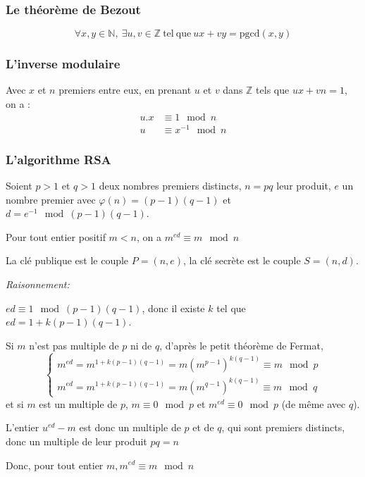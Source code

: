 \documentclass[11pt]{book}
\begin{document}
\subsubsection{Le théorème de Bezout}
$$ \forall x,y \in \mathbb{N},\ \exists u , v \in \mathbb{Z}\ \mathrm{tel\ que}\ ux+vy=\mathrm{pgcd}(x,y) $$

\subsubsection{L'inverse modulaire}
Avec $x$ et $n$ premiers entre eux, en prenant $u$ et $v$ dans $\mathbb{Z}$ tels que
$ux+vn=1$, on a : 
\begin{align*} 
  u.x &\equiv 1  \mod n  \\
  u &\equiv x^{-1} \mod n 
\end{align*}

\subsubsection{L'algorithme RSA}

Soient $p>1$ et $q>1$ deux nombres premiers distincts, $n=pq$ leur produit,
 $e$ un nombre premier avec 
$\varphi(n) = (p−1)(q−1)$ et $d = e^{−1} \mod{(p−1)(q−1)}$.

Pour tout entier positif $m<n$, on a $m^{ed} ≡ m \mod n$

La clé publique  est le couple $P=(n,e)$,
la clé secrète est le couple $S=(n,d)$.

\textit{Raisonnement:}

$ed≡1 \mod (p−1)(q−1)$, donc il existe $k$ tel que $ed=1+k(p−1)(q−1)$.

Si $m$ n’est pas multiple de $p$ ni de $q$, 
d’après le petit théorème de Fermat,
$$
\begin{cases}
  m^{ed}= m^{1+k(p−1)(q−1)} = m (m^{p-1})^{k(q-1)} \equiv m \mod p \\ 
 
  m^{ed}= m^{1+k(p−1)(q−1)} = m (m^{q-1})^{k(q-1)} \equiv m \mod q
\end{cases}
$$
et si $m$ est un multiple de $p$, $m≡0 \mod p$ et $m^{ed}≡0 \mod p$ (de même avec $q$).

 L’entier $u^{ed}−m$ est donc un multiple de $p$ et de $q$, qui sont premiers distincts, 
 donc un multiple de leur produit $pq=n$

 Donc, pour tout entier $m, m^{ed} ≡ m \mod n$
\end{document}
